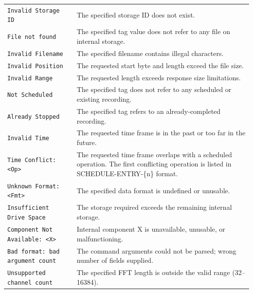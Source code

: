 \begin{longtable}{l p{8cm}}
\texttt{Invalid Storage ID}
    & The specified storage ID does not exist. \\

\texttt{File not found}
    & The specified tag value does not refer to any file on
      internal storage. \\

\texttt{Invalid Filename}
    & The specified filename contains illegal characters. \\

\texttt{Invalid Position}
    & The requested start byte and length exceed the file size. \\

\texttt{Invalid Range}
    & The requested length exceeds response size limitations. \\

\texttt{Not Scheduled}
    & The specified tag does not refer to any scheduled or
      existing recording. \\

\texttt{Already Stopped}
    & The specified tag refers to an already-completed recording. \\

\texttt{Invalid Time}
    & The requested time frame is in the past or too far in the
      future. \\

\texttt{Time Conflict: <Op>}
    & The requested time frame overlaps with a scheduled operation.
      The first conflicting operation is listed in SCHEDULE-ENTRY-\{n\}
      format. \\

\texttt{Unknown Format: <Fmt>}
    & The specified data format is undefined or unusable. \\

\texttt{Insufficient Drive Space}
    & The storage required exceeds the remaining internal storage. \\

\texttt{Component Not Available: <X>}
    & Internal component X is unavailable, unusable, or
      malfunctioning. \\

\texttt{Bad format: bad argument count}
    & The command arguments could not be parsed; wrong number of
      fields supplied. \\

\texttt{Unsupported channel count}
    & The specified FFT length is outside the valid range
      (32--16384). \\


\end{longtable}
